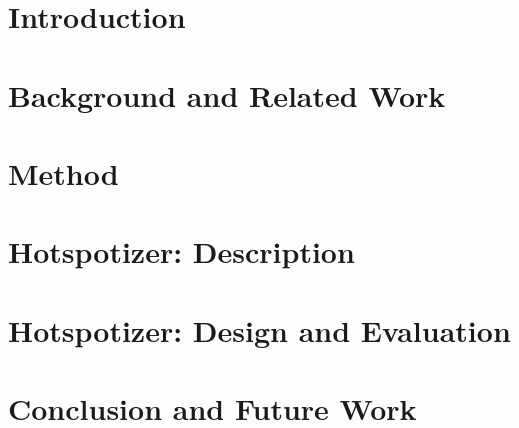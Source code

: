 \documentclass[10pt, twoside]{book}
\begin{document}
\mainmatter

\chapter{Introduction}
\label{chp:introduction}


\chapter{Background and Related Work}


\chapter{Method}
\label{chp:method}


\chapter{Hotspotizer: Description}


\chapter{Hotspotizer: Design and Evaluation}


\chapter{Conclusion and Future Work}


\printbibliography

\appendix

\end{document}
